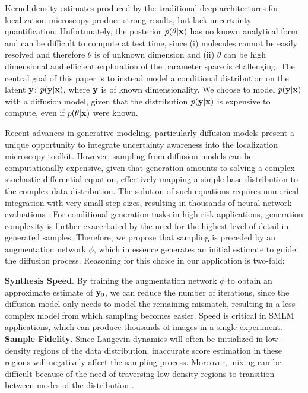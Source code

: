 \documentclass{article}
\begin{document}
Kernel density estimates produced by the traditional deep architectures for localization microscopy produce strong results, but lack uncertainty quantification. Unfortunately, the posterior $p(\theta|\bold{x})$ has no known analytical form and can be difficult to compute at test time, since (i) molecules cannot be easily resolved and therefore $\theta$ is of unknown dimension and (ii) $\theta$ can be high dimensional and efficient exploration of the parameter space is challenging. The central goal of this paper is to instead model a conditional distribution on the latent $\bold{y}$: $p(\bold{y}|\bold{x})$, where $\bold{y}$ is of known dimensionality. We choose to model $p(\bold{y}|\bold{x})$ with a diffusion model, given that the distribution $p(\bold{y}|\bold{x})$ is expensive to compute, even if $p(\theta|\bold{x})$ were known.

Recent advances in generative modeling, particularly diffusion models \citep{SohlDickstein2015,Ho2020,Song2021} present a unique opportunity to integrate uncertainty awareness into the localization microscopy toolkit. However, sampling from diffusion models can be computationally expensive, given that generation amounts to solving a complex stochastic differential equation, effectively mapping a simple base distribution to the complex data distribution. The solution of such equations requires numerical integration with very small step sizes, resulting in thousands of neural network evaluations \citep{Saharia2021,Vahdat2021}. For conditional generation tasks in high-risk applications, generation complexity is further exacerbated by the need for the highest level of detail in generated samples. Therefore, we propose that sampling is preceded by an augmentation network $\phi$, which in essence generates an initial estimate to guide the diffusion process. Reasoning for this choice in our application is two-fold:

\textbf{Synthesis Speed}. By training the augmentation network $\phi$ to obtain an approximate estimate of $\bold{y}_{0}$, we can reduce the number of iterations, since the diffusion model only needs to model the remaining mismatch, resulting in a less complex model from which sampling becomes easier. Speed is critical in SMLM applications, which can produce thousands of images in a single experiment.\\

\textbf{Sample Fidelity}. Since Langevin dynamics will often be initialized in low-density regions of the data distribution, inaccurate score estimation in these regions will negatively affect the sampling process. Moreover, mixing can be difficult because of the need of traversing low density regions to transition between modes of the distribution \citep{Song2019}.
\end{document}
